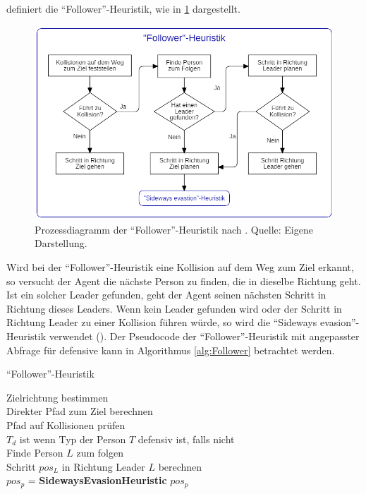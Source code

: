 \cite{Seitz.2016} definiert die "`Follower"'-Heuristik, wie in \figurename \ref{fig:followerHeuristik} dargestellt.
\begin{figure}[H]
	\centering
		\includegraphics[width=1.0\textwidth]{pictures/model/algorithm/heuristics/follower_heuristic.png}
	\caption{Prozessdiagramm der "`Follower"'-Heuristik nach \cite{Seitz.2016}. Quelle: Eigene Darstellung.}
	\label{fig:followerHeuristik}
\end{figure}
Wird bei der "`Follower"'-Heuristik eine Kollision auf dem Weg zum Ziel erkannt, so versucht der Agent die nächste Person zu finden, die in dieselbe Richtung geht. Ist ein solcher Leader gefunden, geht der Agent seinen nächsten Schritt in Richtung dieses Leaders. Wenn kein Leader gefunden wird oder der Schritt in Richtung Leader zu einer Kollision führen würde, so wird die "`Sideways evasion"'-Heuristik verwendet (\cite{Seitz.2016}). Der Pseudocode der "`Follower"'-Heuristik mit angepasster Abfrage für defensive kann in Algorithmus \ref{alg:Follower} betrachtet werden.
\clearpage
\begin{algorithm} [H]
	\caption{"`Follower"'-Heuristik}
	\label{alg:Follower}
	
	\FollowerHeuristic{} {
		Zielrichtung bestimmen \\
		Direkter Pfad zum Ziel berechnen \\
		Pfad auf Kollisionen prüfen \\
		$T_d$ ist \True wenn Typ der Person $T$ defensiv ist, \False falls nicht \\
		 {
			Finde Person $L$ zum folgen \\
			 { 
				Schritt $pos_L$ in Richtung Leader $L$ berechnen \\
				 {
					$pos_p$ = \textbf{SidewaysEvasionHeuristic}
				} 
			} 
		} 
		\Return $pos_p$
	}
\end{algorithm}

